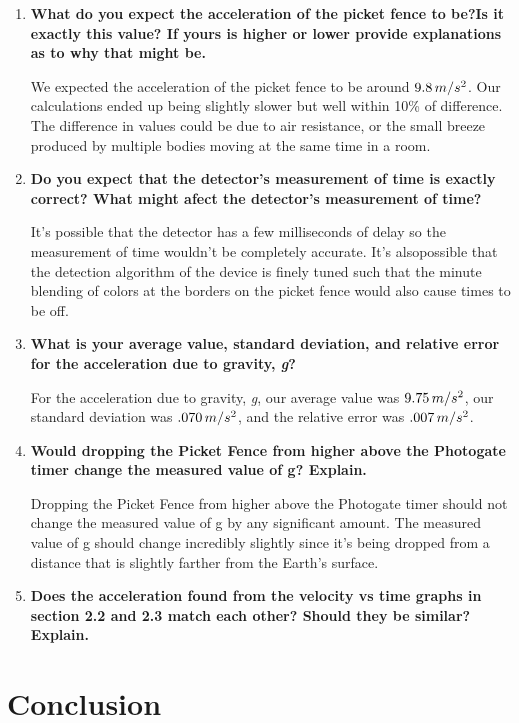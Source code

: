 \documentclass[a4paper,12pt]{article}
\begin{document}
\begin{enumerate}
	\item \textbf{What do you expect the acceleration of the picket fence to be?Is it exactly this value? If yours is higher or lower provide explanations as to why that might be.}

		We expected the acceleration of the picket fence to be around $9.8\thinspace{m/s^2}$. Our calculations ended up being slightly slower but well within 10\% of difference. The difference in values could be due to air resistance, or the small breeze produced by multiple bodies moving at the same time in a room.

	\item \textbf{Do you expect that the detector's measurement of time is exactly correct? What might afect the detector's measurement of time?}

	It's possible that the detector has a few milliseconds of delay so the measurement of time wouldn't be completely accurate. It's alsopossible that the detection algorithm of the device is finely tuned such that the minute blending of colors at the borders on the picket fence would also cause times to be off.

\item \textbf{What is your average value, standard deviation, and relative error for the acceleration due to gravity, \textit{g}?}

		For the acceleration due to gravity, \textit{g}, our average value was \textbf{$9.75\thinspace{m/s^2}$}, our standard deviation was \textbf{$.070\thinspace{m/s^2}$}, and the relative error was \textbf{$.007\thinspace{m/s^2}$}.

\item \textbf{Would dropping the Picket Fence from higher above the Photogate timer change the measured value of g? Explain.}

	Dropping the Picket Fence from higher above the Photogate timer should not change the measured value of g by any significant amount. The measured value of g should change incredibly slightly since it's being dropped from a distance that is slightly farther from the Earth's surface.

\item \textbf{Does the acceleration found from the velocity vs time graphs in section 2.2 and 2.3 match each other? Should they be similar? Explain.}




	
\end{enumerate}






\section{Conclusion}

\vspace{-0.5cm}
\singlespacing
\end{document}
